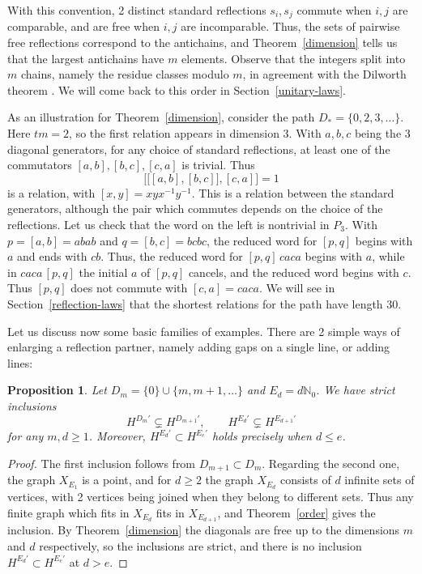 \documentclass[11pt,a4paper]{article}
\newtheorem{prop}[thm]{Proposition}
\begin{document}
With this convention, 2 distinct standard reflections $s_i,s_j$ commute when $i,j$ are comparable, and are free when $i,j$ are incomparable. Thus, the sets of pairwise free reflections correspond to the antichains, and Theorem~\ref{dimension} tells us that the largest antichains have $m$ elements. Observe that the integers split into $m$ chains, namely the residue classes modulo $m$, in agreement with the Dilworth theorem \cite{dilworth}. We will come back to this order in Section~\ref{unitary-laws}.

As an illustration for Theorem~\ref{dimension}, consider the path $D_*=\{0,2,3,\ldots\}$. Here $tm=2$, so the first relation appears in dimension 3. With $a,b,c$ being the 3 diagonal generators, for any choice of standard reflections, at least one of the commutators $[a,b],[b,c],[c,a]$ is trivial. Thus
\[
 \big[\big[[a,b],[b,c]\big],[c,a]\big]=1
\]
is a relation, with $[x,y]=xyx^{-1}y^{-1}$. This is a relation between the standard generators, although the pair which commutes depends on the choice of the reflections. Let us check that the word on the left is nontrivial in $P_3$. With $p=[a,b]=abab$ and $q=[b,c]=bcbc$, the reduced word for $[p,q]$ begins with $a$ and ends with $cb$. Thus, the reduced word for $[p,q]\,caca$ begins with $a$, while in $caca\,[p,q]$ the initial $a$ of $[p,q]$ cancels, and the reduced word begins with $c$. Thus $[p,q]$ does not commute with $[c,a]=caca$. We will see in Section~\ref{reflection-laws} that the shortest relations for the path have length 30.

Let us discuss now some basic families of examples. There are 2 simple ways of enlarging a reflection partner, namely adding gaps on a single line, or adding lines:

\begin{prop}\label{series}
Let $D_m=\{0\}\cup\{m,m+1,\ldots\}$ and $E_d=d\mathbb N_0$. We have strict inclusions
\[
 H^{D_m'}\subsetneq H^{D_{m+1}'},\qquad H^{E_d'}\subsetneq H^{E_{d+1}'}
\]
for any $m,d\geq1$. Moreover, $H^{E_d'}\subset H^{E_e'}$ holds precisely when $d\leq e$.
\end{prop}

\begin{proof}
The first inclusion follows from $D_{m+1}\subset D_m$. Regarding the second one, the graph $X_{E_1}$ is a point, and for $d\geq2$ the graph $X_{E_d}$ consists of $d$ infinite sets of vertices, with 2 vertices being joined when they belong to different sets. Thus any finite graph which fits in $X_{E_d}$ fits in $X_{E_{d+1}}$, and Theorem~\ref{order} gives the inclusion. By Theorem~\ref{dimension} the diagonals are free up to the dimensions $m$ and $d$ respectively, so the inclusions are strict, and there is no inclusion $H^{E_d'}\subset H^{E_e'}$ at $d>e$.
\end{proof}
\end{document}
